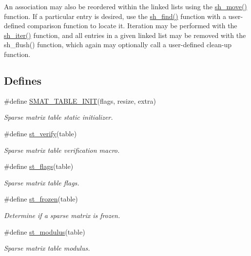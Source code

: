 An association may also be reordered within the linked lists using the \hyperlink{group__dbprim__smat_a18}{sh\_\-move()} function. If a particular entry is desired, use the \hyperlink{group__dbprim__smat_a19}{sh\_\-find()} function with a user-defined comparison function to locate it. Iteration may be performed with the \hyperlink{group__dbprim__smat_a20}{sh\_\-iter()} function, and all entries in a given linked list may be removed with the sh\_\-flush() function, which again may optionally call a user-defined clean-up function. \subsection*{Defines}
\begin{CompactItemize}
\item 
\#define \hyperlink{group__dbprim__smat_a21}{SMAT\_\-TABLE\_\-INIT}(flags, resize, extra)
\begin{CompactList}\small\item\em Sparse matrix table static initializer.\item\end{CompactList}\item 
\#define \hyperlink{group__dbprim__smat_a22}{st\_\-verify}(table)
\begin{CompactList}\small\item\em Sparse matrix table verification macro.\item\end{CompactList}\item 
\#define \hyperlink{group__dbprim__smat_a23}{st\_\-flags}(table)
\begin{CompactList}\small\item\em Sparse matrix table flags.\item\end{CompactList}\item 
\#define \hyperlink{group__dbprim__smat_a24}{st\_\-frozen}(table)
\begin{CompactList}\small\item\em Determine if a sparse matrix is frozen.\item\end{CompactList}\item 
\#define \hyperlink{group__dbprim__smat_a25}{st\_\-modulus}(table)
\begin{CompactList}\small\item\em Sparse matrix table modulus.\item\end{CompactList}\item 

\end{CompactItemize}
